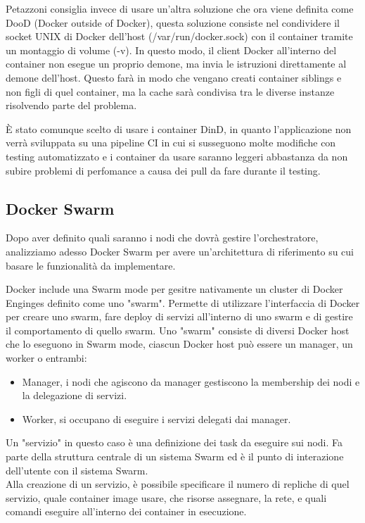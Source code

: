 \documentclass[12pt,a4paper]{article}
\begin{document}
Petazzoni consiglia invece di usare un'altra soluzione che ora viene definita come DooD (Docker outside of Docker), questa soluzione consiste nel condividere il socket UNIX di Docker dell'host (/var/run/docker.sock) con il container tramite un montaggio di volume (-v). In questo modo, il client Docker all'interno del container non esegue un proprio demone, ma invia le istruzioni direttamente al demone dell'host. Questo farà in modo che vengano creati container siblings e non figli di quel container, ma la cache sarà condivisa tra le diverse instanze risolvendo parte del problema\cite{petazzoni_dind}.

È stato comunque scelto di usare i container DinD, in quanto l'applicazione non verrà sviluppata su una pipeline CI in cui si susseguono molte modifiche con testing automatizzato e i container da usare saranno leggeri abbastanza da non subire problemi di perfomance a causa dei pull da fare durante il testing.
\subsection{Docker Swarm}
Dopo aver definito quali saranno i nodi che dovrà gestire l'orchestratore, analizziamo adesso Docker Swarm per avere un'architettura di riferimento su cui basare le funzionalità da implementare.

Docker include una Swarm mode per gesitre nativamente un cluster di Docker Enginges definito come uno "swarm". Permette di utilizzare l'interfaccia di Docker per creare uno swarm, fare deploy di servizi all'interno di uno swarm e di gestire il comportamento di quello swarm. \cite{docker_swarm}
\newpage
Uno "swarm" consiste di diversi Docker host che lo eseguono in Swarm mode, ciascun Docker host può essere un manager, un worker o entrambi: 
\begin{itemize}
    \item Manager, i nodi che agiscono da manager gestiscono la membership dei nodi e la delegazione di servizi.
    \item Worker, si occupano di eseguire i servizi delegati dai manager.
\end{itemize}

Un "servizio" in questo caso è una definizione dei task da eseguire sui nodi. Fa parte della struttura centrale di un sistema Swarm ed è il punto di interazione dell'utente con il sistema Swarm.\\
Alla creazione di un servizio, è possibile specificare il numero di repliche di quel servizio, quale container image usare, che risorse assegnare, la rete, e quali comandi eseguire all'interno dei container in esecuzione.\cite{docker_swarm_key_concepts}
\end{document}

